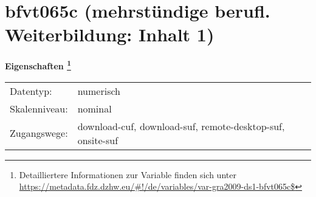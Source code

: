 
    \setcounter{footnote}{0}

    \vspace*{-1.8cm}
	\section{bfvt065c (mehrstündige berufl. Weiterbildung: Inhalt 1)}
	\label{section:bfvt065c}



    \vspace*{0.5cm}
    \noindent\textbf{Eigenschaften
	\footnote{Detailliertere Informationen zur Variable finden sich unter
		\url{https://metadata.fdz.dzhw.eu/\#!/de/variables/var-gra2009-ds1-bfvt065c$}}}\\
	\begin{tabularx}{\hsize}{@{}lX}
	Datentyp: & numerisch \\
	Skalenniveau: & nominal \\
	Zugangswege: &
	  download-cuf, 
	  download-suf, 
	  remote-desktop-suf, 
	  onsite-suf
 \\
    \end{tabularx}



